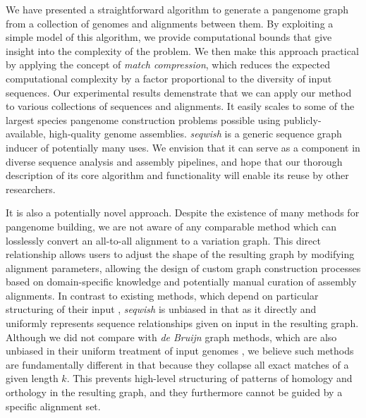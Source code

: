 \documentclass{bioinfo}
\theoremstyle{definition}
\begin{document}
We have presented a straightforward algorithm to generate a pangenome graph from a collection of genomes and alignments between them.
By exploiting a simple model of this algorithm, we provide computational bounds that give insight into the complexity of the problem.
We then make this approach practical by applying the concept of \textit{match compression}, which reduces the expected computational complexity by a factor proportional to the diversity of input sequences.
Our experimental results demenstrate that we can apply our method to various collections of sequences and alignments.
It easily scales to some of the largest species pangenome construction problems possible using publicly-available, high-quality genome assemblies.
\textit{seqwish} is a generic sequence graph inducer of potentially many uses.
We envision that it can serve as a component in diverse sequence analysis and assembly pipelines, and hope that our thorough description of its core algorithm and functionality will enable its reuse by other researchers.

It is also a potentially novel approach.
Despite the existence of many methods for pangenome building, we are not aware of any comparable method which can losslessly convert an all-to-all alignment to a variation graph.
This direct relationship allows users to adjust the shape of the resulting graph by modifying alignment parameters, allowing the design of custom graph construction processes based on domain-specific knowledge and potentially manual curation of assembly alignments.
In contrast to existing methods, which depend on particular structuring of their input \citep{Li:2020,Armstrong:2020}, \textit{seqwish} is unbiased in that as it directly and uniformly represents sequence relationships given on input in the resulting graph.
Although we did not compare with \textit{de Bruijn} graph methods, which are also unbiased in their uniform treatment of input genomes \citep{Minkin_2016,Yu_2021}, we believe such methods are fundamentally different in that because they collapse all exact matches of a given length $k$.
This prevents high-level structuring of patterns of homology and orthology in the resulting graph, and they furthermore cannot be guided by a specific alignment set.
\end{document}
